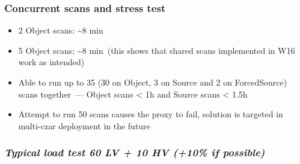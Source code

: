 \subsubsection{\texorpdfstring{\textbf{Concurrent scans and stress
test}}{Concurrent scans and stress test}}\label{concurrent-scans-and-stress-test}

\begin{itemize}
\item
  2 Object scans: \textasciitilde{}8 min
\item
  5 Object scans: \textasciitilde{}8 min~(this shows that shared scans
  implemented in W16 work as intended)
\item
  Able to run up to 35 (30 on Object, 3 on Source and 2 on ForcedSource)
  scans together~--- Object scans \textless{} 1h and Source scans
  \textless{} 1.5h
\item
  Attempt to run 50 scans causes the proxy to fail, solution is targeted
  in multi-czar deployment in the future
\end{itemize}

\subsubsection{\texorpdfstring{\textbf{\emph{Typical load test 60 LV +
10 HV (+10\% if
possible)}}}{Typical load test 60 LV + 10 HV (+10\% if possible)}}\label{typical-load-test-60-lv-10-hv-10-if-possible}

